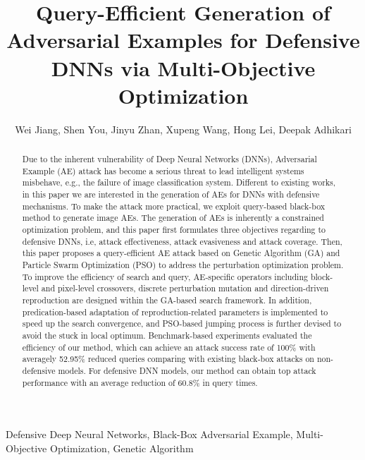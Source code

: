 \documentclass[lettersize,journal]{IEEEtran}
\begin{document}


\title{
Query-Efficient Generation of Adversarial Examples for Defensive DNNs via Multi-Objective Optimization
}
\author{Wei Jiang, Shen You, Jinyu Zhan, Xupeng Wang, Hong Lei, Deepak Adhikari}
\maketitle

\begin{abstract}
Due to the inherent vulnerability of Deep Neural Networks (DNNs), Adversarial Example (AE) attack has become a serious threat to lead intelligent systems misbehave, e.g., the failure of image classification system. Different to existing works, in this paper we are interested in the generation of AEs for DNNs with defensive mechanisms. To make the attack more practical, we exploit query-based black-box method to generate image AEs. The generation of AEs is inherently a constrained optimization problem, and this paper first formulates three objectives regarding to defensive DNNs, i.e, attack effectiveness, attack evasiveness and attack coverage. Then, this paper proposes a query-efficient AE attack based on Genetic Algorithm (GA) and Particle Swarm Optimization (PSO) to address the perturbation optimization problem. To improve the efficiency of search and query, AE-specific operators including block-level and pixel-level crossovers, discrete perturbation mutation and direction-driven reproduction are designed within the GA-based search framework. In addition, predication-based adaptation of reproduction-related parameters is implemented to speed up the search convergence, and PSO-based jumping process is further devised to avoid the stuck in local optimum. Benchmark-based experiments evaluated the efficiency of our method, which can achieve an attack success rate of 100\%  with averagely 52.95\% reduced queries comparing with existing black-box attacks on non-defensive models. For defensive DNN models, our method can obtain top attack performance with an average reduction of 60.8\% in query times.



\end{abstract} 

\begin{IEEEkeywords}
Defensive Deep Neural Networks, Black-Box Adversarial Example, Multi-Objective Optimization, Genetic Algorithm
\end{IEEEkeywords}
\end{document}
